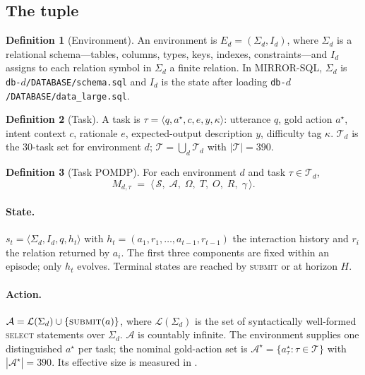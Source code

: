 \documentclass[11pt,letterpaper]{article}
\theoremstyle{definition}
\newtheorem{definition}{Definition}
\theoremstyle{plain}
\theoremstyle{remark}
\newcommand{\Aset}{\mathcal{A}}
\newcommand{\Sset}{\mathcal{S}}
\newcommand{\Tset}{\mathcal{T}}
\newcommand{\code}[1]{\texttt{#1}}
\begin{document}
\subsection{The tuple}

\begin{definition}[Environment]
An environment is $E_d = (\Sigma_d, I_d)$, where $\Sigma_d$ is a relational schema---tables,
columns, types, keys, indexes, constraints---and $I_d$ assigns to each relation symbol in
$\Sigma_d$ a finite relation. In MIRROR-SQL, $\Sigma_d$ is \code{db-$d$/DATABASE/schema.sql} and
$I_d$ is the state after loading \code{db-$d$/DATABASE/data\_large.sql}.
\end{definition}

\begin{definition}[Task]
A task is $\tau = \langle q, a^\star, c, e, y, \kappa \rangle$: utterance $q$, gold action
$a^\star$, intent context $c$, rationale $e$, expected-output description $y$, difficulty tag
$\kappa$. $\Tset_d$ is the $30$-task set for environment $d$; $\Tset = \bigcup_d \Tset_d$ with
$|\Tset| = 390$.
\end{definition}

\begin{definition}[Task POMDP]
For each environment $d$ and task $\tau \in \Tset_d$,
\[
  M_{d,\tau} \;=\; \langle\, \Sset,\; \Aset,\; \Omega,\; T,\; O,\; R,\; \gamma \,\rangle .
\]
\end{definition}

\paragraph{State.}
$s_t = \langle \Sigma_d, I_d, q, h_t \rangle$ with $h_t = (a_1, r_1, \dots, a_{t-1}, r_{t-1})$
the interaction history and $r_i$ the relation returned by $a_i$. The first three components
are fixed within an episode; only $h_t$ evolves. Terminal states are reached by
\textsc{submit} or at horizon $H$.

\paragraph{Action.}
$\Aset = \mathcal{L}(\Sigma_d) \cup \{\textsc{submit}(a)\}$, where $\mathcal{L}(\Sigma_d)$ is
the set of syntactically well-formed \textsc{select} statements over $\Sigma_d$. $\Aset$ is
countably infinite. The environment supplies one distinguished $a^\star$ per task; the nominal
gold-action set is $\Aset^\star = \{a^\star_\tau : \tau \in \Tset\}$ with $|\Aset^\star| = 390$.
Its effective size is measured in .
\end{document}
